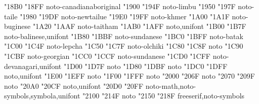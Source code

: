 \documentclass{article}
\begin{document}
     {  "18B0} {  "18FF} {noto-canadianaboriginal}
                                              {  "1900} {  "194F} {noto-limbu}
                                             {  "1950} {  "197F} {noto-taile}
                                        {  "1980} {  "19DF} {noto-newtailue}
                                      {  "19E0} {  "19FF} {noto-khmer}
                                           {  "1A00} {  "1A1F} {noto-buginese}
                                           {  "1A20} {  "1AAF} {noto-taitham}
               {  "1AB0} {  "1AFF} {noto,unifont}
                                           {  "1B00} {  "1B7F} {noto-balinese,unifont}
                                          {  "1B80} {  "1BBF} {noto-sundanese}
                                              {  "1BC0} {  "1BFF} {noto-batak}
                                             {  "1C00} {  "1C4F} {noto-lepcha}
                                           {  "1C50} {  "1C7F} {noto-olchiki}
                                {  "1C80} {  "1C8F} {noto}
                                  {  "1C90} {  "1CBF} {noto-georgian}
                               {  "1CC0} {  "1CCF} {noto-sundanese}
                                   {  "1CD0} {  "1CFF} {noto-devanagari,unifont}
                                {  "1D00} {  "1D7F} {noto}
                     {  "1D80} {  "1DBF} {noto}
             {  "1DC0} {  "1DFF} {noto,unifont}
                          {  "1E00} {  "1EFF} {noto}
                                     {  "1F00} {  "1FFF} {noto}
                                {  "2000} {  "206F} {noto}
                        {  "2070} {  "209F} {noto}
                                   {  "20A0} {  "20CF} {noto,unifont}
            {  "20D0} {  "20FF} {noto-math,noto-symbols,symbola,unifont}
                                 {  "2100} {  "214F} {noto}
                                       {  "2150} {  "218F} {freeserif,noto-symbols}
\end{document}
